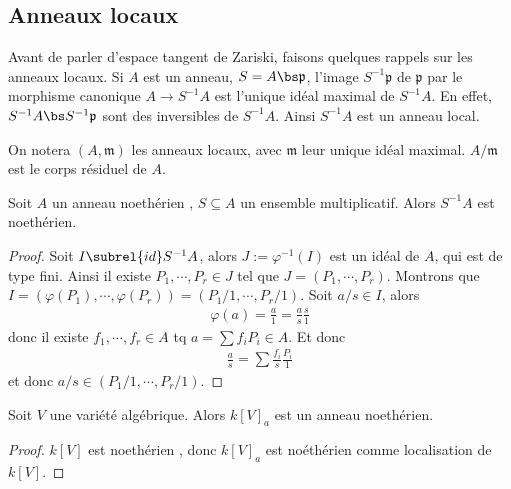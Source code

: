         \subsection{Anneaux locaux}
            Avant de parler d'espace tangent de Zariski, faisons quelques rappels sur les anneaux locaux. Si $A$ est un anneau, $S = A \bs \mathfrak{p}$, l'image $S^{-1} \mathfrak{p}$ de $\mathfrak{p}$ par le morphisme canonique $A \to S^{-1}A$ est l'unique idéal maximal de $S^{-1}A$. En effet, $S^{-1} A \bs S^{-1}\mathfrak{p}$ sont des inversibles de $S^{-1}A$. Ainsi $S^{-1}A$ est un anneau local. 
            \begin{nota}
                On notera $(A, \mathfrak{m})$ les anneaux locaux, avec $\mathfrak{m}$ leur unique idéal maximal. $A/\mathfrak{m}$ est le corps résiduel de $A$.
            \end{nota}
            \begin{prop}
                Soit $A$ un anneau noethérien , $S \subseteq A$ un ensemble multiplicatif. Alors $S^{-1}A$ est noethérien.
            \end{prop}
            \begin{proof}
                Soit $I \subrel{id} S^{-1}A$,  alors $J := \varphi^{-1}(I)$ est un idéal de $A$, qui est de type fini. Ainsi il existe $P_1, \cdots, P_r \in J$ tel que $J = (P_1, \cdots, P_r)$. Montrons que $I = (\varphi(P_1), \cdots, \varphi(P_r)) = (P_1/1, \cdots, P_r/1)$. Soit $a/s \in I$, alors 
                \begin{align*}
                    \varphi(a) = \frac a1 = \frac as \frac s1
                \end{align*}
                donc il existe $f_1, \cdots, f_r \in A$ tq $a = \sum f_i P_i \in A$. Et donc
                \begin{align*}
                    \frac as = \sum \frac{f_i}s \frac{P_i}1
                \end{align*}
                et donc $a/s \in (P_1/1, \cdots, P_r/1)$.
            \end{proof}
            \begin{coro}
                Soit $V$ une variété algébrique. Alors $k[V]_a$ est un anneau noethérien.
            \end{coro}
            \begin{proof}
                $k[V]$ est noethérien , donc $k[V]_a$ est noéthérien comme localisation de $k[V]$.
            \end{proof}
